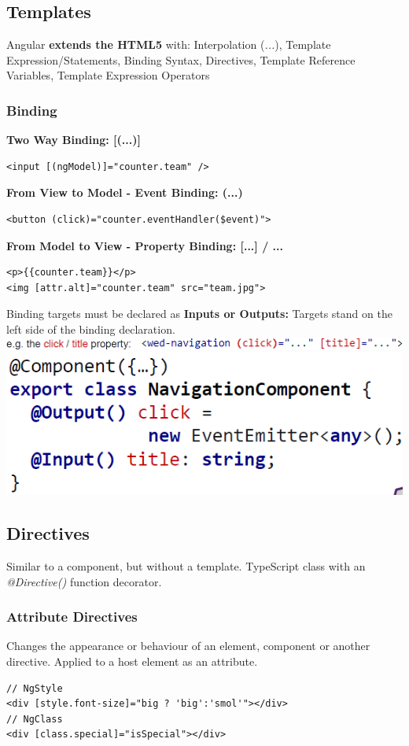 \subsection{Templates}
 Angular \textbf{extends the HTML5} with:
Interpolation (\textit{{{...}}}),
Template Expression/Statements,
Binding Syntax,
Directives,
Template Reference Variables,
Template Expression Operators

\subsubsection{Binding}
\textbf{Two Way Binding: [(...)]}
\begin{lstlisting}
<input [(ngModel)]="counter.team" />
\end{lstlisting}
\textbf{From View to Model - Event Binding: (...)}
\begin{lstlisting}
<button (click)="counter.eventHandler($event)">
\end{lstlisting}
\textbf{From Model to View - Property Binding: [...] / {{...}}}
\begin{lstlisting}
<p>{{counter.team}}</p>
<img [attr.alt]="counter.team" src="team.jpg">
\end{lstlisting}
Binding targets must be declared as \textbf{Inputs or Outputs:} Targets stand on the left side of the binding declaration.
\includegraphics[width=\linewidth]{img/angular_input_output_properties.png}
\includegraphics[width=0.5\linewidth]{img/angular_input_output_properties2.png}

\subsection{Directives}
Similar to a component, but without a template.
TypeScript class with an \textit{@Directive()} function decorator.
\subsubsection{Attribute Directives}
Changes the appearance or behaviour of an element, component or another directive.
Applied to a host element as an attribute.
\begin{lstlisting}
// NgStyle
<div [style.font-size]="big ? 'big':'smol'"></div>
// NgClass
<div [class.special]="isSpecial"></div>
\end{lstlisting}
